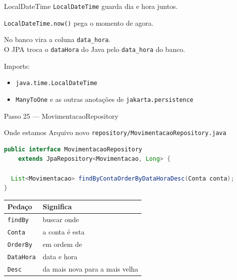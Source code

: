 \documentclass[aspectratio=169,11pt]{beamer}
\newcommand{\onde}[1]{%
  \begin{block}{Onde estamos}
    #1
  \end{block}
}
\begin{document}
\begin{frame}{LocalDateTime}
  \texttt{LocalDateTime} guarda dia e hora juntos.

  \vspace{0.5em}
  \texttt{LocalDateTime.now()} pega o momento de agora.

  \vspace{0.5em}
  No banco vira a coluna \texttt{data\_hora}.\\
  O JPA troca o \texttt{dataHora} do Java pelo \texttt{data\_hora} do banco.

  \vspace{0.5em}
  Imports:
  \begin{itemize}
    \item \texttt{java.time.LocalDateTime}
    \item \texttt{ManyToOne} e as outras anotações de \texttt{jakarta.persistence}
  \end{itemize}
\end{frame}

\begin{frame}[fragile]{Passo 25 --- MovimentacaoRepository}
  \onde{Arquivo novo \texttt{repository/MovimentacaoRepository.java}}

\begin{lstlisting}[language=Java,basicstyle=\ttfamily\footnotesize]
public interface MovimentacaoRepository
    extends JpaRepository<Movimentacao, Long> {

  List<Movimentacao> findByContaOrderByDataHoraDesc(Conta conta);
}
\end{lstlisting}

  \vspace{0.2em}
  \begin{center}
  \small
  \begin{tabular}{ll}
    \toprule
    Pedaço & Significa \\
    \midrule
    \texttt{findBy} & buscar onde \\
    \texttt{Conta} & a conta é esta \\
    \texttt{OrderBy} & em ordem de \\
    \texttt{DataHora} & data e hora \\
    \texttt{Desc} & da mais nova para a mais velha \\
    \bottomrule
  \end{tabular}
  \end{center}
\end{frame}
\end{document}
